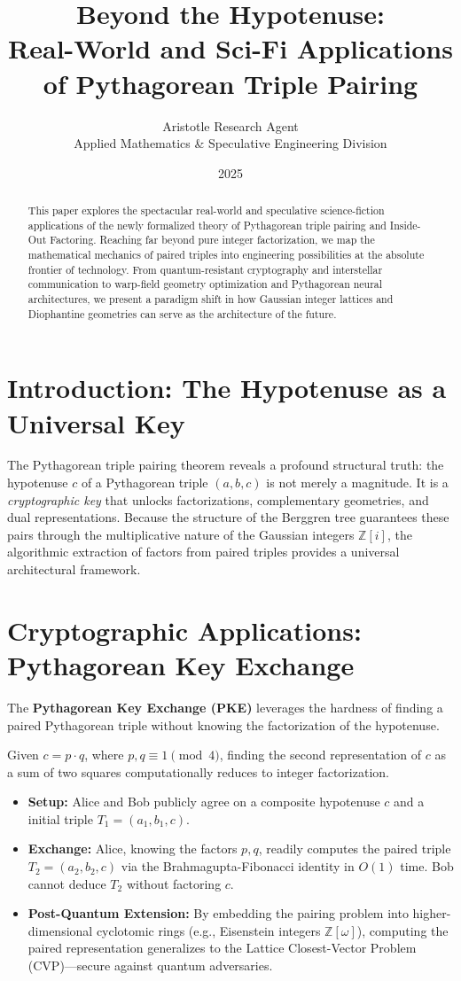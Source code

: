 \documentclass[12pt,a4paper]{article}
\title{\textbf{Beyond the Hypotenuse:}\\[0.5em] \Large Real-World and Sci-Fi Applications of Pythagorean Triple Pairing}
\author{Aristotle Research Agent\\ \small Applied Mathematics \& Speculative Engineering Division}
\date{2025}
\begin{document}
\maketitle

\begin{abstract}
This paper explores the spectacular real-world and speculative science-fiction applications of the newly formalized theory of Pythagorean triple pairing and Inside-Out Factoring. Reaching far beyond pure integer factorization, we map the mathematical mechanics of paired triples into engineering possibilities at the absolute frontier of technology. From quantum-resistant cryptography and interstellar communication to warp-field geometry optimization and Pythagorean neural architectures, we present a paradigm shift in how Gaussian integer lattices and Diophantine geometries can serve as the architecture of the future.
\end{abstract}

\section{Introduction: The Hypotenuse as a Universal Key}

The Pythagorean triple pairing theorem reveals a profound structural truth: the hypotenuse $c$ of a Pythagorean triple $(a, b, c)$ is not merely a magnitude. It is a \textit{cryptographic key} that unlocks factorizations, complementary geometries, and dual representations. Because the structure of the Berggren tree guarantees these pairs through the multiplicative nature of the Gaussian integers $\mathbb{Z}[i]$, the algorithmic extraction of factors from paired triples provides a universal architectural framework.

\section{Cryptographic Applications: Pythagorean Key Exchange}

The \textbf{Pythagorean Key Exchange (PKE)} leverages the hardness of finding a paired Pythagorean triple without knowing the factorization of the hypotenuse.

Given $c = p \cdot q$, where $p, q \equiv 1 \pmod 4$, finding the second representation of $c$ as a sum of two squares computationally reduces to integer factorization.
\begin{itemize}
    \item \textbf{Setup:} Alice and Bob publicly agree on a composite hypotenuse $c$ and a initial triple $T_1 = (a_1, b_1, c)$.
    \item \textbf{Exchange:} Alice, knowing the factors $p, q$, readily computes the paired triple $T_2 = (a_2, b_2, c)$ via the Brahmagupta-Fibonacci identity in $O(1)$ time. Bob cannot deduce $T_2$ without factoring $c$.
    \item \textbf{Post-Quantum Extension:} By embedding the pairing problem into higher-dimensional cyclotomic rings (e.g., Eisenstein integers $\mathbb{Z}[\omega]$), computing the paired representation generalizes to the Lattice Closest-Vector Problem (CVP)—secure against quantum adversaries.
\end{itemize}
\end{document}
